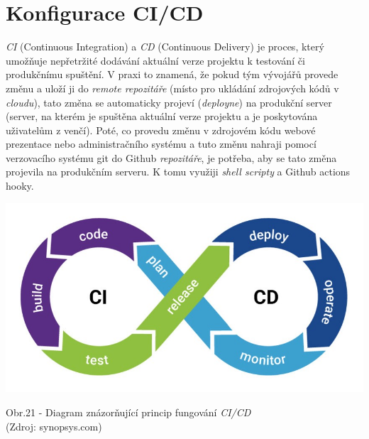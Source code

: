 \documentclass[12pt,a4paper]{report}
\begin{document}
  \section{Konfigurace CI/CD}
  \emph{CI} (Continuous Integration) a \emph{CD} (Continuous Delivery) je proces, který umožňuje nepřetržité 
  dodávání aktuální verze projektu k testování či produkčnímu spuštění. V praxi to znamená,
  že pokud tým vývojářů provede změnu a uloží ji do \emph{remote repozitáře}
  (místo pro ukládání zdrojových kódů v \emph{cloudu}), tato změna se automaticky projeví (\emph{deployne})
  na produkční server (server, na kterém je spuštěna aktuální verze projektu a je poskytována
  uživatelům z venčí).
  Poté, co provedu změnu v zdrojovém kódu webové prezentace nebo administračního systému a 
  tuto změnu nahraji pomocí verzovacího systému git do Github \emph{repozitáře}, je potřeba, aby se 
  tato změna projevila na produkčním serveru. K tomu využiji \emph{shell scripty} a Github actions hooky.

  \vspace*{0.5cm}
  \noindent\includegraphics[width=\linewidth]{CICD.jpg}
  \begin{center}
    Obr.21 - Diagram znázorňující princip fungování \emph{CI/CD}   \\
    (Zdroj: synopsys.com)
  \end{center}
  \vspace*{0.5cm}
\end{document}
